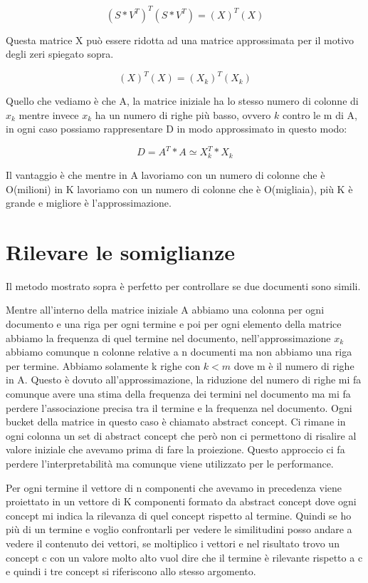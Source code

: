 \documentclass[14pt]{extreport}
\begin{document}
\begin{equation}
    (S*V^T)^T(S*V^T) = (X)^T(X)
\end{equation}

Questa matrice X può essere ridotta ad una matrice approssimata per il motivo degli zeri spiegato sopra.

\begin{equation}
    (X)^T(X) = (X_k)^T(X_k)
\end{equation}

Quello che vediamo è che A, la matrice iniziale ha lo stesso numero di colonne di $x_k$ mentre invece $x_k$ ha un numero di righe più basso, ovvero $k$ contro le m di A, in ogni caso possiamo rappresentare D in modo approssimato in questo modo:

\begin{equation}
    D = A^T*A \simeq X_k^T*X_k
\end{equation}

Il vantaggio è che mentre in A lavoriamo con un numero di colonne che è O(milioni) in K lavoriamo con un numero di colonne che è O(migliaia), più K è grande e migliore è l'approssimazione.

\section{Rilevare le somiglianze}

Il metodo mostrato sopra è perfetto per controllare se due documenti sono simili.

Mentre all'interno della matrice iniziale A abbiamo una colonna per ogni documento e una riga per ogni termine e poi per ogni elemento della matrice abbiamo la frequenza di quel termine nel documento, nell'approssimazione $x_k$ abbiamo comunque n colonne relative a n documenti ma non abbiamo una riga per termine. Abbiamo solamente k righe con $k<m$ dove m è il numero di righe in A.
Questo è dovuto all'approssimazione, la riduzione del numero di righe mi fa comunque avere una stima della frequenza dei termini nel documento ma mi fa perdere l'associazione precisa tra il termine e la frequenza nel documento. Ogni bucket della matrice in questo caso è chiamato abstract concept. Ci rimane in ogni colonna un set di abstract concept che però non ci permettono di risalire al valore iniziale che avevamo prima di fare la proiezione.
Questo approccio ci fa perdere l'interpretabilità ma comunque viene utilizzato per le performance.

Per ogni termine il vettore di n componenti che avevamo in precedenza viene proiettato in un vettore di K componenti formato da abstract concept dove ogni concept mi indica la rilevanza di quel concept rispetto al termine.
Quindi se ho più di un termine e voglio confrontarli per vedere le similitudini posso andare a vedere il contenuto dei vettori, se moltiplico i vettori e nel risultato trovo un concept c con un valore molto alto vuol dire che il termine è rilevante rispetto a c e quindi i tre concept si riferiscono allo stesso argomento.
\end{document}
